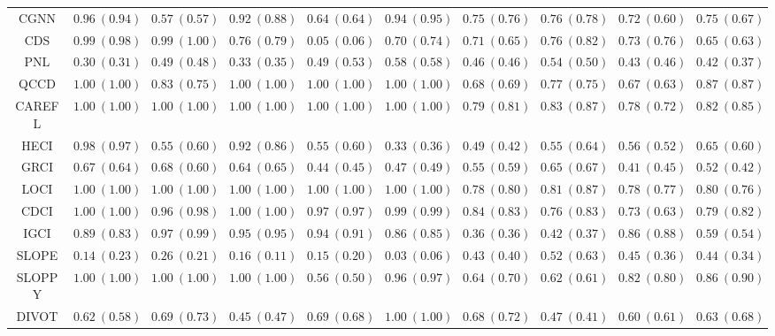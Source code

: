 \documentclass{article}
\theoremstyle{plain}
\theoremstyle{definition}
\theoremstyle{remark}
\begin{document}
{\begin{table}[!htbp]
\begin{center}
{\begin{tabular}{c|ccccc|cccc}
CGNN& $0.96\ (0.94)$& $0.57\ (0.57)$& $0.92\ (0.88)$& $0.64\ (0.64)$& $0.94\ (0.95)$& $0.75\ (0.76)$& $0.76\ (0.78)$& $0.72\ (0.60)$& $0.75\ (0.67)$ \\
CDS& $0.99\ (0.98)$& $0.99\ (1.00)$& $0.76\ (0.79)$& $0.05\ (0.06)$& $0.70\ (0.74)$& $0.71\ (0.65)$& $0.76\ (0.82)$& $0.73\ (0.76)$& $0.65\ (0.63)$ \\
PNL& $0.30\ (0.31)$& $0.49\ (0.48)$& $0.33\ (0.35)$& $0.49\ (0.53)$& $0.58\ (0.58)$& $0.46\ (0.46)$& $0.54\ (0.50)$& $0.43\ (0.46)$& $0.42\ (0.37)$ \\
QCCD& $\bm{1.00}\ (1.00)$& $0.83\ (0.75)$& $\bm{1.00}\ (1.00)$& $\bm{1.00}\ (1.00)$& $\bm{1.00}\ (1.00)$& $0.68\ (0.69)$& $0.77\ (0.75)$& $0.67\ (0.63)$& $0.87\ (0.87)$ \\
CAREFL& $\bm{1.00}\ (1.00)$& $\bm{1.00}\ (1.00)$& $\bm{1.00}\ (1.00)$& $\bm{1.00}\ (1.00)$& $\bm{1.00}\ (1.00)$& $0.79\ (0.81)$& $0.83\ (0.87)$& $0.78\ (0.72)$& $0.82\ (0.85)$ \\
HECI& $0.98\ (0.97)$& $0.55\ (0.60)$& $0.92\ (0.86)$& $0.55\ (0.60)$& $0.33\ (0.36)$& $0.49\ (0.42)$& $0.55\ (0.64)$& $0.56\ (0.52)$& $0.65\ (0.60)$ \\
GRCI& $0.67\ (0.64)$& $0.68\ (0.60)$& $0.64\ (0.65)$& $0.44\ (0.45)$& $0.47\ (0.49)$& $0.55\ (0.59)$& $0.65\ (0.67)$& $0.41\ (0.45)$& $0.52\ (0.42)$ \\
LOCI& $\bm{1.00}\ (1.00)$& $\bm{1.00}\ (1.00)$& $\bm{1.00}\ (1.00)$& $\bm{1.00}\ (1.00)$& $\bm{1.00}\ (1.00)$& $0.78\ (0.80)$& $0.81\ (0.87)$& $0.78\ (0.77)$& $0.80\ (0.76)$ \\
CDCI& $\bm{1.00}\ (1.00)$& $0.96\ (0.98)$& $\bm{1.00}\ (1.00)$& $0.97\ (0.97)$& $0.99\ (0.99)$& $0.84\ (0.83)$& $0.76\ (0.83)$& $0.73\ (0.63)$& $0.79\ (0.82)$ \\
IGCI& $0.89\ (0.83)$& $0.97\ (0.99)$& $0.95\ (0.95)$& $0.94\ (0.91)$& $0.86\ (0.85)$& $0.36\ (0.36)$& $0.42\ (0.37)$& $0.86\ (0.88)$& $0.59\ (0.54)$ \\
SLOPE& $0.14\ (0.23)$& $0.26\ (0.21)$& $0.16\ (0.11)$& $0.15\ (0.20)$& $0.03\ (0.06)$& $0.43\ (0.40)$& $0.52\ (0.63)$& $0.45\ (0.36)$& $0.44\ (0.34)$ \\
SLOPPY& $\bm{1.00}\ (1.00)$& $\bm{1.00}\ (1.00)$& $\bm{1.00}\ (1.00)$& $0.56\ (0.50)$& $0.96\ (0.97)$& $0.64\ (0.70)$& $0.62\ (0.61)$& $0.82\ (0.80)$& $0.86\ (0.90)$ \\
DIVOT& $0.62\ (0.58)$& $0.69\ (0.73)$& $0.45\ (0.47)$& $0.69\ (0.68)$& $\bm{1.00}\ (1.00)$& $0.68\ (0.72)$& $0.47\ (0.41)$& $0.60\ (0.61)$& $0.63\ (0.68)$ \\

\end{tabular}}
\end{center}
\end{table}}
\end{document}
